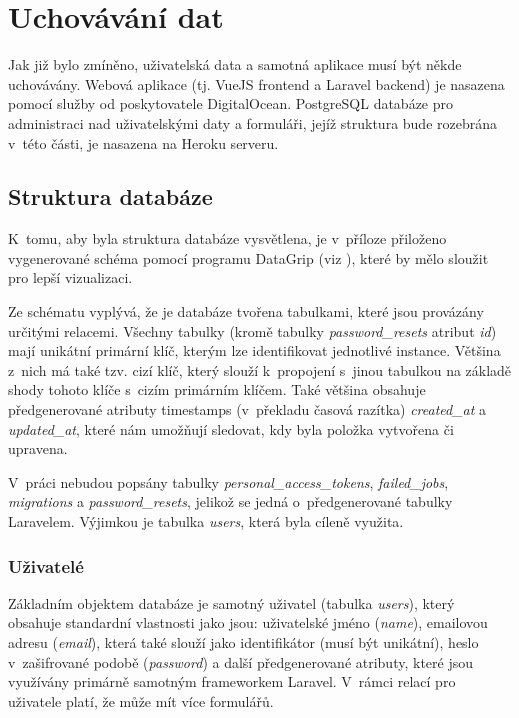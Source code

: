 \section{Uchovávání dat}
Jak již bylo zmíněno, uživatelská data a samotná aplikace musí být někde uchovávány. Webová aplikace (tj. VueJS frontend a Laravel backend) je nasazena pomocí služby  od poskytovatele DigitalOcean. PostgreSQL databáze pro administraci nad uživatelskými daty a formuláři, jejíž struktura bude rozebrána v~této části, je nasazena na Heroku serveru. 

	\subsection{Struktura databáze}
	K~tomu, aby byla struktura databáze vysvětlena, je v~příloze přiloženo vygenerované schéma pomocí programu DataGrip (viz ), které by mělo sloužit pro lepší vizualizaci. 
	
	Ze schématu vyplývá, že je databáze tvořena tabulkami, které jsou provázány určitými relacemi. Všechny tabulky (kromě tabulky \textit{password\_resets} atribut \textit{id}) mají unikátní primární klíč, kterým lze identifikovat jednotlivé instance. Většina z~nich má také tzv. cizí klíč, který slouží k~propojení s~jinou tabulkou na základě shody tohoto klíče s~cizím primárním klíčem. Také většina obsahuje předgenerované atributy timestamps (v~překladu časová razítka) \textit{created\_at} a \textit{updated\_at}, které nám umožňují sledovat, kdy byla položka vytvořena či upravena.
	
	V~práci nebudou popsány tabulky \textit{personal\_access\_tokens}, \textit{failed\_jobs}, \textit{migrations} a \textit{password\_resets}, jelikož se jedná o~předgenerované tabulky Laravelem. Výjimkou je tabulka \textit{users}, která byla cíleně využita.
	
	\subsubsection{Uživatelé}
	Základním objektem databáze je samotný uživatel (tabulka \textit{users}), který obsahuje standardní vlastnosti jako jsou: uživatelské jméno (\textit{name}), emailovou adresu (\textit{email}), která také slouží jako identifikátor (musí být unikátní), heslo v~zašifrované podobě (\textit{password}) a další předgenerované atributy, které jsou využívány primárně samotným frameworkem Laravel. V~rámci relací pro uživatele platí, že může mít více formulářů.
	
